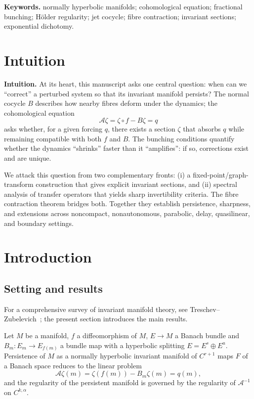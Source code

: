 \documentclass[11pt,a4paper]{article}
\theoremstyle{plain}
\theoremstyle{definition}
\theoremstyle{remark}
\numberwithin{equation}{section}
\numberwithin{figure}{section}
\begin{document}
\textbf{Keywords.} normally hyperbolic manifolds; cohomological equation; fractional bunching; Hölder regularity; jet cocycle; fibre contraction; invariant sections; exponential dichotomy.

\section*{Intuition}

\textbf{Intuition.} At its heart, this manuscript asks one central question: when can we ``correct'' a perturbed system so that its invariant manifold persists? The normal cocycle $B$ describes how nearby fibres deform under the dynamics; the cohomological equation
\[
\mathcal A\zeta = \zeta\circ f - B\zeta = q
\]
asks whether, for a given forcing $q$, there exists a section $\zeta$ that absorbs $q$ while remaining compatible with both $f$ and $B$. The bunching conditions quantify whether the dynamics ``shrinks'' faster than it ``amplifies'': if so, corrections exist and are unique.

We attack this question from two complementary fronts: (i) a fixed-point/graph-transform construction that gives explicit invariant sections, and (ii) spectral analysis of transfer operators that yields sharp invertibility criteria. The fibre contraction theorem bridges both. Together they establish persistence, sharpness, and extensions across noncompact, nonautonomous, parabolic, delay, quasilinear, and boundary settings.

\section{Introduction}

\subsection{Setting and results}

For a comprehensive survey of invariant manifold theory, see Treschev–Zubelevich~\cite{tre2010}; the present section introduces the main results.

Let $M$ be a manifold, $f$ a diffeomorphism of $M$, $E\to M$ a Banach bundle and $B_m:E_m\to E_{f(m)}$ a bundle map with a hyperbolic splitting $E=E^s\oplus E^u$. Persistence of $M$ as a normally hyperbolic invariant manifold of $C^{r+1}$ maps $F$ of a Banach space reduces to the linear problem
\[
\mathcal A\zeta(m)=\zeta(f(m))-B_m\zeta(m)=q(m),
\]
and the regularity of the persistent manifold is governed by the regularity of $\mathcal A^{-1}$ on $C^{k,\alpha}$.
\end{document}
